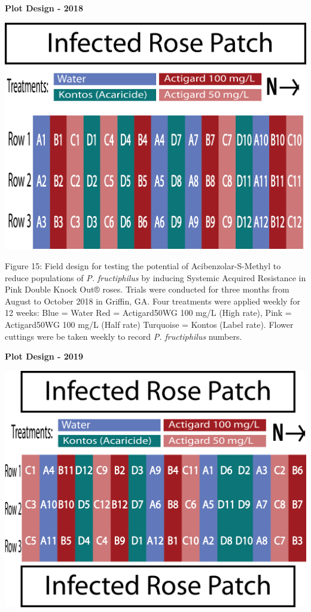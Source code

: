 \documentclass[12pt,final,CPage]{ufthesis}
\begin{document}
{  \textbf{Plot Design - 2018}
  \begin{center}\includegraphics[width=0.8\linewidth]{figure/rrv_asm_plot_2018_griffin} \end{center}

  Figure 15: Field design for testing the potential of Acibenzolar-S-Methyl to reduce populations of \emph{P. fructiphilus} by inducing Systemic Acquired Resistance in Pink Double Knock Out® roses. Trials were conducted for three months from August to October 2018 in Griffin, GA. Four treatments were applied weekly for 12 weeks: Blue = Water Red = Actigard50WG 100 mg/L (High rate), Pink = Actigard50WG 100 mg/L (Half rate) Turquoise = Kontos (Label rate). Flower cuttings were be taken weekly to record \emph{P. fructiphilus} numbers.

  \textbf{Plot Design - 2019}
  \begin{center}\includegraphics[width=0.8\linewidth]{figure/rrv_asm_plot_2019_griffin} \end{center}

}
\end{document}
